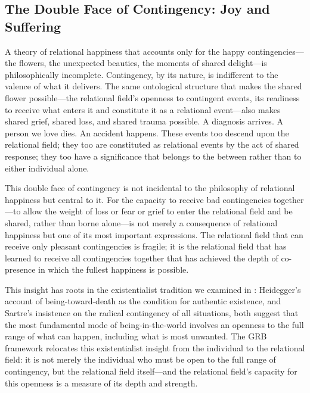 \subsection{The Double Face of Contingency: Joy and Suffering}
\label{p14:subsec:doubleFace}

\noindent
A theory of relational happiness that accounts only for the happy contingencies---the flowers, the unexpected beauties, the moments of shared delight---is philosophically incomplete. Contingency, by its nature, is indifferent to the valence of what it delivers. The same ontological structure that makes the shared flower possible---the relational field's openness to contingent events, its readiness to receive what enters it and constitute it as a relational event---also makes shared grief, shared loss, and shared trauma possible. A diagnosis arrives. A person we love dies. An accident happens. These events too descend upon the relational field; they too are constituted as relational events by the act of shared response; they too have a significance that belongs to the between rather than to either individual alone.

This double face of contingency is not incidental to the philosophy of relational happiness but central to it. For the capacity to receive bad contingencies together---to allow the weight of loss or fear or grief to enter the relational field and be shared, rather than borne alone---is not merely a consequence of relational happiness but one of its most important expressions. The relational field that can receive only pleasant contingencies is fragile; it is the relational field that has learned to receive all contingencies together that has achieved the depth of co-presence in which the fullest happiness is possible.

This insight has roots in the existentialist tradition we examined in : Heidegger's account of being-toward-death as the condition for authentic existence, and Sartre's insistence on the radical contingency of all situations, both suggest that the most fundamental mode of being-in-the-world involves an openness to the full range of what can happen, including what is most unwanted. The GRB framework relocates this existentialist insight from the individual to the relational field: it is not merely the individual who must be open to the full range of contingency, but the relational field itself---and the relational field's capacity for this openness is a measure of its depth and strength.

